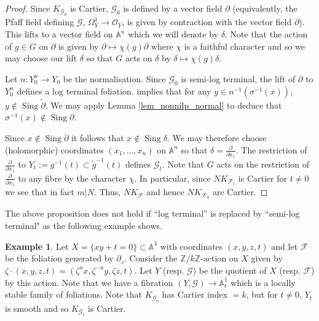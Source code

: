 \documentclass[12pt, a4paper]{amsart}
\DeclareMathOperator{\sing}{Sing}
\theoremstyle{definition}
\newtheorem{ej}[theorem]{Example}
\theoremstyle{named}
\begin{document}
\begin{proof}
Since $K_{\mathcal G_0}$ is Cartier, $\mathcal G_0$ is defined by a vector field $\partial$
(equivalently, the Pfaff field defining $\mathcal G$, $\Omega^1_{Y} \rightarrow \mathcal O_{Y}$, is given by contraction
with the vector field $\partial$).  This lifts to a vector field
on $\mathbb A^n$ which we will denote by $\delta$.  Note that the
action of $g \in G$ on $\partial$ is given by $\partial \mapsto \chi(g)\partial$
where $\chi$ is a faithful character and so we may choose our lift $\delta$ so that $G$ acts on $\delta$ by $\delta \mapsto \chi(g)\delta$.

Let $n\colon Y^n_0 \to Y_0$ be the normalisation.
Since $\mathcal G_0$ is semi-log terminal, the lift of $\partial$
to $Y^n_0$ defines a 
log terminal foliation.  \cite[Fact III.i.1]{MP13} implies that for any  $y \in n^{-1}(\sigma^{-1}(x))$, $y \notin \sing \tilde{\partial}$,
We may apply Lemma \ref{lem_nonnilp_normal}
to deduce that $\sigma^{-1}(x) \notin \sing \partial$.



Since $x \notin \sing \partial$ it follows that $x \not\in \sing \delta$.
We may therefore choose (holomorphic) coordinates $(x_1, \dots, x_{n})$ on $\mathbb A^n$ so that $\delta = \frac{\partial}{\partial x_1}$.
The restriction of $\frac{\partial}{\partial x_1}$ to 
$Y_t := g^{-1}(t) \subset \tilde{g}^{-1}(t)$ defines $\mathcal G_t$.  Note that $G$ acts on the restriction 
of $\frac{\partial}{\partial x_1}$ to any fibre by the character $\chi$.  In particular, since $NK_{\mathcal F_t}$ is Cartier for $t \neq 0$  we see that in fact 
$m|N$.  Thus, $NK_{\mathcal F}$ and hence $NK_{\mathcal F_0}$ are Cartier.
\fi
\end{proof}

The above proposition does not hold if ``log terminal'' is replaced by ``semi-log terminal" as the following example shows.

\begin{ej}
\label{slt_index_jumps}
    Let $X = \{xy+t = 0\} \subset \mathbb A^4$ with coordinates $(x,y,z, t)$ and let $\mathcal F$ be the foliation generated by $\partial_z$.
    Consider the $\mathbb Z/k\mathbb Z$-action on $X$ given by $\zeta \cdot (x, y, z, t) = (\zeta^{a}x, \zeta^{-a}y, \zeta z, t)$.  Let $Y$ (resp. $\mathcal G$) be the quotient of $X$ (resp. $\mathcal F$) by this action.
    Note that we have a fibration $(Y, \mathcal G) \to \mathbb A^1_t$ which is a locally stable family of foliations.
    Note that $K_{\mathcal G_0}$ has Cartier index $=k$, but for $t \neq 0$, $Y_t$ is smooth and so $K_{\mathcal G_t}$ is Cartier.
\end{ej}
\end{document}
